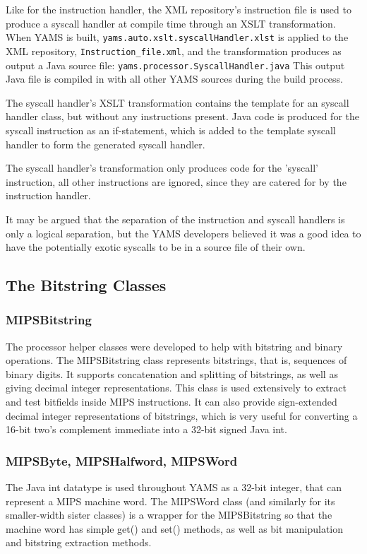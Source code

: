 Like for the instruction handler, the XML repository's instruction file is used to produce a syscall handler at compile time through an XSLT transformation.
When YAMS is built, \verb'yams.auto.xslt.syscallHandler.xlst' is applied to the XML repository, \verb'Instruction_file.xml', and the transformation produces as output a Java source file: \verb'yams.processor.SyscallHandler.java'
This output Java file is compiled in with all other YAMS sources during the build process.

The syscall handler's XSLT transformation contains the template for an syscall handler class, but without any instructions present. Java code is produced for the syscall instruction as an if-statement, which is added to the template syscall handler to form the generated syscall handler. 

The syscall handler's transformation only produces code for the 'syscall' instruction, all other instructions are ignored, since they are catered for by the instruction handler.

It may be argued that the separation of the instruction and syscall handlers is only a logical separation, but the YAMS developers believed it was a good idea to have the potentially exotic syscalls to be in a source file of their own.

\subsection{The Bitstring Classes}

\subsubsection{MIPSBitstring}

The processor helper classes were developed to help with bitstring and binary operations.
The MIPSBitstring class represents bitstrings, that is, sequences of binary digits. It supports concatenation and splitting of bitstrings, as well as giving decimal integer representations. This class is used extensively to extract and test bitfields inside MIPS instructions. It can also provide sign-extended decimal integer representations of bitstrings, which is very useful for converting a 16-bit two's complement immediate into a 32-bit signed Java int.

\subsubsection{MIPSByte, MIPSHalfword, MIPSWord}

The Java int datatype is used throughout YAMS as a 32-bit integer, that can represent a MIPS machine word. The MIPSWord class (and similarly for its smaller-width sister classes) is a wrapper for the MIPSBitstring so that the machine word has simple get() and set() methods, as well as bit manipulation and bitstring extraction methods.

